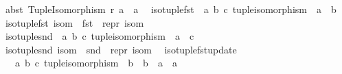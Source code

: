 \begin{isabellebody}
\ \ {\isachardoublequoteopen}abst\ {\isacharparenleft}{\kern0pt}Tuple{\isacharunderscore}{\kern0pt}Isomorphism\ r\ a{\isacharparenright}{\kern0pt}\ {\isacharequal}{\kern0pt}\ a{\isachardoublequoteclose}\isanewline
\isanewline
{}\isamarkupfalse%
\isanewline
\ \ iso{\isacharunderscore}{\kern0pt}tuple{\isacharunderscore}{\kern0pt}fst\ {\isacharcolon}{\kern0pt}{\isacharcolon}{\kern0pt}\ {\isachardoublequoteopen}{\isacharparenleft}{\kern0pt}{\isacharprime}{\kern0pt}a{\isacharcomma}{\kern0pt}\ {\isacharprime}{\kern0pt}b{\isacharcomma}{\kern0pt}\ {\isacharprime}{\kern0pt}c{\isacharparenright}{\kern0pt}\ tuple{\isacharunderscore}{\kern0pt}isomorphism\ {\isasymRightarrow}\ {\isacharprime}{\kern0pt}a\ {\isasymRightarrow}\ {\isacharprime}{\kern0pt}b{\isachardoublequoteclose}\ \isanewline
\ \ {\isachardoublequoteopen}iso{\isacharunderscore}{\kern0pt}tuple{\isacharunderscore}{\kern0pt}fst\ isom\ {\isacharequal}{\kern0pt}\ fst\ {\isasymcirc}\ repr\ isom{\isachardoublequoteclose}\isanewline
\isanewline
{}\isamarkupfalse%
\isanewline
\ \ iso{\isacharunderscore}{\kern0pt}tuple{\isacharunderscore}{\kern0pt}snd\ {\isacharcolon}{\kern0pt}{\isacharcolon}{\kern0pt}\ {\isachardoublequoteopen}{\isacharparenleft}{\kern0pt}{\isacharprime}{\kern0pt}a{\isacharcomma}{\kern0pt}\ {\isacharprime}{\kern0pt}b{\isacharcomma}{\kern0pt}\ {\isacharprime}{\kern0pt}c{\isacharparenright}{\kern0pt}\ tuple{\isacharunderscore}{\kern0pt}isomorphism\ {\isasymRightarrow}\ {\isacharprime}{\kern0pt}a\ {\isasymRightarrow}\ {\isacharprime}{\kern0pt}c{\isachardoublequoteclose}\ \isanewline
\ \ {\isachardoublequoteopen}iso{\isacharunderscore}{\kern0pt}tuple{\isacharunderscore}{\kern0pt}snd\ isom\ {\isacharequal}{\kern0pt}\ snd\ {\isasymcirc}\ repr\ isom{\isachardoublequoteclose}\isanewline
\isanewline
{}\isamarkupfalse%
\isanewline
\ \ iso{\isacharunderscore}{\kern0pt}tuple{\isacharunderscore}{\kern0pt}fst{\isacharunderscore}{\kern0pt}update\ {\isacharcolon}{\kern0pt}{\isacharcolon}{\kern0pt}\isanewline
\ \ \ \ {\isachardoublequoteopen}{\isacharparenleft}{\kern0pt}{\isacharprime}{\kern0pt}a{\isacharcomma}{\kern0pt}\ {\isacharprime}{\kern0pt}b{\isacharcomma}{\kern0pt}\ {\isacharprime}{\kern0pt}c{\isacharparenright}{\kern0pt}\ tuple{\isacharunderscore}{\kern0pt}isomorphism\ {\isasymRightarrow}\ {\isacharparenleft}{\kern0pt}{\isacharprime}{\kern0pt}b\ {\isasymRightarrow}\ {\isacharprime}{\kern0pt}b{\isacharparenright}{\kern0pt}\ {\isasymRightarrow}\ {\isacharparenleft}{\kern0pt}{\isacharprime}{\kern0pt}a\ {\isasymRightarrow}\ {\isacharprime}{\kern0pt}a{\isacharparenright}{\kern0pt}{\isachardoublequoteclose}\ \isanewline

\end{isabellebody}
